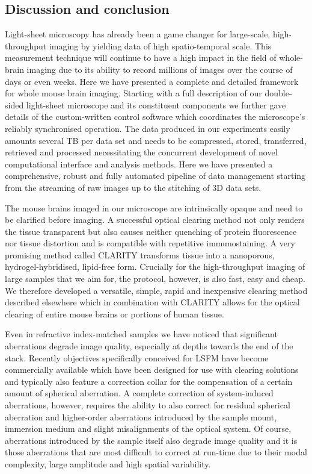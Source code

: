 \documentclass[12pt]{spieman}  %
\begin{document}
\begin{spacing}{2}
\section{Discussion and conclusion}

Light-sheet microscopy has already been a game changer for large-scale, high-throughput imaging by yielding data of high spatio-temporal scale. This measurement technique will continue to have a high impact in the field of whole-brain imaging due to its ability to record millions of images over the course of days or even weeks. Here we have presented a complete and detailed framework for whole mouse brain imaging. Starting with a full description of our double-sided light-sheet microscope and its constituent components we further gave details of the custom-written control software which coordinates the microscope's reliably synchronised operation. The data produced in our experiments easily amounts several TB per data set and needs to be compressed, stored, transferred, retrieved and processed necessitating the concurrent development of novel computational interface and analysis methods. Here we have presented a comprehensive, robust and fully automated pipeline of data management starting from the streaming of raw images up to the stitching of 3D data sets.

The mouse brains imaged in our microscope are intrinsically opaque and need to be clarified before imaging. A successful optical clearing method not only renders the tissue transparent but also causes neither quenching of protein fluorescence nor tissue distortion and is compatible with repetitive immunostaining. A very promising method called CLARITY\cite{Chung2013,Tomer2014} transforms tissue into a nanoporous, hydrogel-hybridised, lipid-free form. Crucially for the high-throughput imaging of large samples that we aim for, the protocol, however, is also fast, easy and cheap. We therefore developed a versatile, simple, rapid and inexpensive clearing method described elsewhere\cite{Costantini} which in combination with CLARITY allows for the optical clearing of entire mouse brains or portions of human tissue.

Even in refractive index-matched samples we have noticed that significant aberrations degrade image quality, especially at depths towards the end of the stack. Recently objectives specifically conceived for LSFM have become commercially available\cite{Marx2014} which have been designed for use with clearing solutions and typically also feature a correction collar for the compensation of a certain amount of spherical aberration. A complete correction of system-induced aberrations, however, requires the ability to also correct for residual spherical aberration and higher-order aberrations introduced by the sample mount, immersion medium and slight misalignments of the optical system. Of course, aberrations introduced by the sample itself also degrade image quality and it is those aberrations that are most difficult to correct at run-time due to their modal complexity, large amplitude and high spatial variability\cite{Wang2014}. 


\end{spacing}
\end{document}
